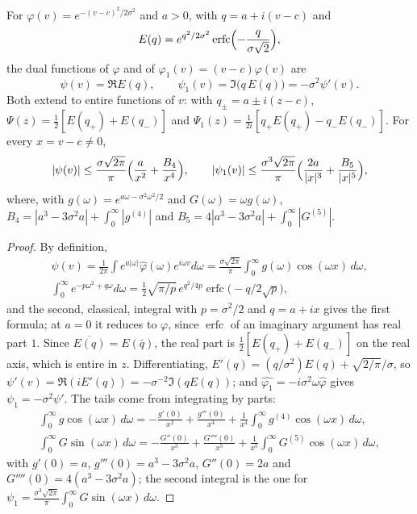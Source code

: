 \begin{lemma}\label{cx:lem:psiclosed}
For $\varphi(v)=e^{-(v-c)^2/2\sigma^2}$ and $a>0$, with $q=a+i(v-c)$ and
\[
E(q)=e^{q^2/2\sigma^2}\operatorname{erfc}\Bigl(-\frac q{\sigma\sqrt2}\Bigr),
\]
the dual functions of $\varphi$ and of $\varphi_1(v)=(v-c)\varphi(v)$ are
\[
\psi(v)=\Re E(q),\qquad\psi_1(v)=\Im\bigl(q\,E(q)\bigr)=-\sigma^2\psi'(v).
\]
Both extend to entire functions of $v$: with $q_\pm=a\pm i(z-c)$, $\Psi(z)=\tfrac12[E(q_+)+E(q_-)]$ and $\Psi_1(z)=\frac1{2i}[q_+E(q_+)-q_-E(q_-)]$. For every $x=v-c\ne0$,
\[
|\psi(v)|\le\frac{\sigma\sqrt{2\pi}}\pi\Bigl(\frac a{x^2}+\frac{B_4}{x^4}\Bigr),\qquad
|\psi_1(v)|\le\frac{\sigma^3\sqrt{2\pi}}\pi\Bigl(\frac{2a}{|x|^3}+\frac{B_5}{|x|^5}\Bigr),
\]
where, with $g(\omega)=e^{a\omega-\sigma^2\omega^2/2}$ and $G(\omega)=\omega g(\omega)$, $B_4=|a^3-3\sigma^2a|+\int_0^\infty|g^{(4)}|$ and $B_5=4|a^3-3\sigma^2a|+\int_0^\infty|G^{(5)}|$.
\end{lemma}

\begin{proof}
By definition,
\begin{gather*}
\psi(v)=\frac1{2\pi}\int e^{a|\omega|}\widehat\varphi(\omega)e^{i\omega v}d\omega=\frac{\sigma\sqrt{2\pi}}\pi\int_0^\infty g(\omega)\cos(\omega x)\,d\omega,\\
\int_0^\infty e^{-p\omega^2+q\omega}d\omega=\tfrac12\sqrt{\pi/p}\,e^{q^2/4p}\operatorname{erfc}\bigl(-q/2\sqrt p\bigr),
\end{gather*}
and the second, classical, integral with $p=\sigma^2/2$ and $q=a+ix$ gives the first formula; at $a=0$ it reduces to $\varphi$, since $\operatorname{erfc}$ of an imaginary argument has real part $1$. Since $\overline{E(q)}=E(\bar q)$, the real part is $\tfrac12[E(q_+)+E(q_-)]$ on the real axis, which is entire in $z$. Differentiating, $E'(q)=(q/\sigma^2)E(q)+\sqrt{2/\pi}/\sigma$, so $\psi'(v)=\Re(iE'(q))=-\sigma^{-2}\Im(qE(q))$; and $\widehat{\varphi_1}=-i\sigma^2\omega\widehat\varphi$ gives $\psi_1=-\sigma^2\psi'$. The tails come from integrating by parts:
\begin{gather*}
\int_0^\infty g\cos(\omega x)\,d\omega=-\frac{g'(0)}{x^2}+\frac{g'''(0)}{x^4}+\frac1{x^4}\int_0^\infty g^{(4)}\cos(\omega x)\,d\omega,\\
\int_0^\infty G\sin(\omega x)\,d\omega=-\frac{G''(0)}{x^3}+\frac{G''''(0)}{x^5}+\frac1{x^5}\int_0^\infty G^{(5)}\cos(\omega x)\,d\omega,
\end{gather*}
with $g'(0)=a$, $g'''(0)=a^3-3\sigma^2a$, $G''(0)=2a$ and $G''''(0)=4(a^3-3\sigma^2a)$; the second integral is the one for $\psi_1=\frac{\sigma^3\sqrt{2\pi}}\pi\int_0^\infty G\sin(\omega x)\,d\omega$.
\end{proof}

